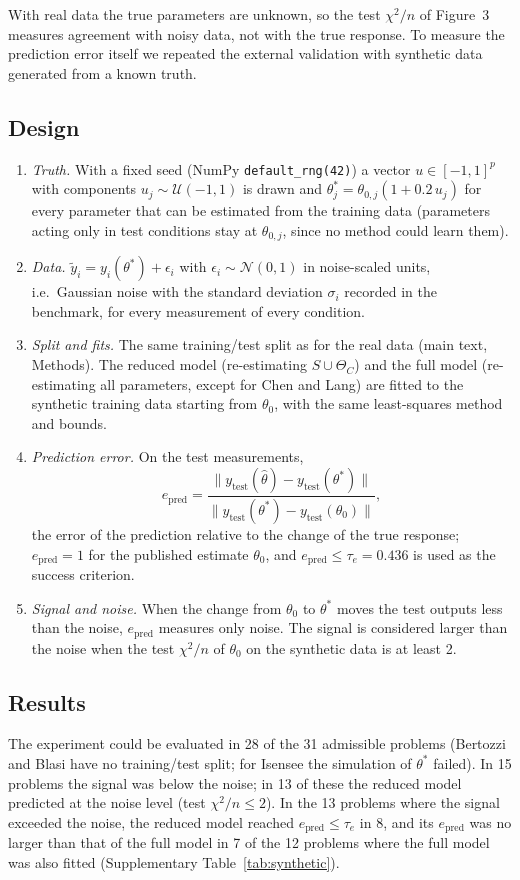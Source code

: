 
With real data the true parameters are unknown, so the test $\chi^2/n$ of Figure~3 measures agreement with noisy data, not with the true response. To measure the prediction error itself we repeated the external validation with synthetic data generated from a known truth.

\subsection*{Design}
\begin{enumerate}\itemsep0pt
\item \emph{Truth.} With a fixed seed (NumPy \texttt{default\_rng(42)}) a vector $u\in[-1,1]^p$ with components $u_j\sim\mathcal U(-1,1)$ is drawn and $\theta^\ast_j=\theta_{0,j}(1+0.2\,u_j)$ for every parameter that can be estimated from the training data (parameters acting only in test conditions stay at $\theta_{0,j}$, since no method could learn them).
\item \emph{Data.} $\tilde y_i=y_i(\theta^\ast)+\epsilon_i$ with $\epsilon_i\sim\mathcal N(0,1)$ in noise-scaled units, i.e.\ Gaussian noise with the standard deviation $\sigma_i$ recorded in the benchmark, for every measurement of every condition.
\item \emph{Split and fits.} The same training/test split as for the real data (main text, Methods). The reduced model (re-estimating $S\cup\Theta_C$) and the full model (re-estimating all parameters, except for Chen and Lang) are fitted to the synthetic training data starting from $\theta_0$, with the same least-squares method and bounds.
\item \emph{Prediction error.} On the test measurements,
\[ e_{\mathrm{pred}}=\frac{\|y_{\mathrm{test}}(\hat\theta)-y_{\mathrm{test}}(\theta^\ast)\|}{\|y_{\mathrm{test}}(\theta^\ast)-y_{\mathrm{test}}(\theta_0)\|}, \]
the error of the prediction relative to the change of the true response; $e_{\mathrm{pred}}=1$ for the published estimate $\theta_0$, and $e_{\mathrm{pred}}\le\tau_e=0.436$ is used as the success criterion.
\item \emph{Signal and noise.} When the change from $\theta_0$ to $\theta^\ast$ moves the test outputs less than the noise, $e_{\mathrm{pred}}$ measures only noise. The signal is considered larger than the noise when the test $\chi^2/n$ of $\theta_0$ on the synthetic data is at least 2.
\end{enumerate}

\subsection*{Results}
The experiment could be evaluated in 28 of the 31 admissible problems (Bertozzi and Blasi have no training/test split; for Isensee the simulation of $\theta^\ast$ failed). In 15 problems the signal was below the noise; in 13 of these the reduced model predicted at the noise level (test $\chi^2/n\le2$). In the 13 problems where the signal exceeded the noise, the reduced model reached $e_{\mathrm{pred}}\le\tau_e$ in 8, and its $e_{\mathrm{pred}}$ was no larger than that of the full model in 7 of the 12 problems where the full model was also fitted (Supplementary Table~\ref{tab:synthetic}).

